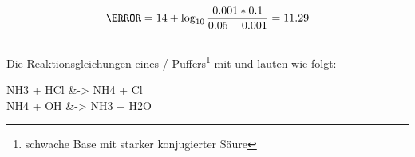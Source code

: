 \documentclass{article}
\begin{document}
        \begin{equation}
          \pH = 14 + \log _{10} \frac{0.001 * 0.1}{0.05 + 0.001} = 11.29 \label{eq:pHWasserzwei}
        \end{equation}\\
        
        Die Reaktionsgleichungen eines / Puffers\footnote{schwache Base mit starker konjugierter Säure} mit  und  lauten wie folgt:
        
        \begin{reactions}
          NH3\aq{} + HCl\aq{} &-> NH4\pch\aq{} + Cl\mch\aq{} \\
          NH4\pch\aq{} + OH\mch\aq{} &-> NH3\aq{} + H2O
        \end{reactions}
  \pagebreak
  
  \listofreactions
  \printbibliography[title=Literaturverzeichnis]
  \listoffigures
  \listoftables
  
\end{document}
